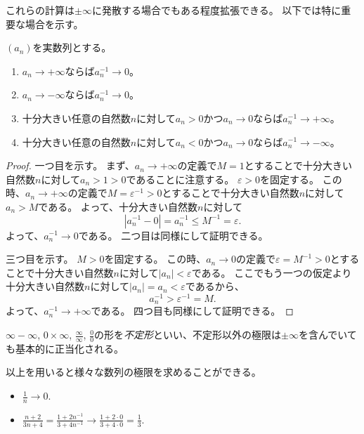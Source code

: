 これらの計算は$\pm \infty$に発散する場合でもある程度拡張できる。
以下では特に重要な場合を示す。

\begin{proposition}
$(a_n)$を実数列とする。
\begin{enumerate}
\item
$a_n \to +\infty$ならば$a_n^{-1} \to 0$。
\item
$a_n \to -\infty$ならば$a_n^{-1} \to 0$。
\item
十分大きい任意の自然数$n$に対して$a_n > 0$かつ$a_n \to 0$ならば$a_n^{-1} \to +\infty$。
\item
十分大きい任意の自然数$n$に対して$a_n < 0$かつ$a_n \to 0$ならば$a_n^{-1} \to -\infty$。
\end{enumerate}
\end{proposition}

\begin{proof}
一つ目を示す。
まず、$a_n \to +\infty$の定義で$M = 1$とすることで十分大きい自然数$n$に対して$a_n > 1 > 0$であることに注意する。
$\varepsilon > 0$を固定する。
この時、$a_n \to +\infty$の定義で$M = \varepsilon^{-1} > 0$とすることで十分大きい自然数$n$に対して$a_n > M$である。
よって、十分大きい自然数$n$に対して
$$
|a_n^{-1}-0| = a_n^{-1} \le M^{-1} = \varepsilon.
$$
よって、$a_n^{-1} \to 0$である。
二つ目は同様にして証明できる。

三つ目を示す。
$M > 0$を固定する。
この時、$a_n \to 0$の定義で$\varepsilon = M^{-1} > 0$とすることで十分大きい自然数$n$に対して$|a_n| < \varepsilon$である。
ここでもう一つの仮定より十分大きい自然数$n$に対して$|a_n| = a_n < \varepsilon$であるから、
$$
a_n^{-1} > \varepsilon^{-1} = M.
$$
よって、$a_n^{-1} \to +\infty$である。
四つ目も同様にして証明できる。
\end{proof}

$\infty-\infty$, $0\times\infty$, $\frac{\infty}{\infty}$, $\frac{0}{0}$の形を\emph{不定形}といい、不定形以外の極限は$\pm \infty$を含んでいても基本的に正当化される。

以上を用いると様々な数列の極限を求めることができる。

\begin{example}
\begin{itemize}
\item
$\frac{1}{n} \to 0$.
\item
$\frac{n+2}{3 n+4} = \frac{1+2 n^{-1}}{3+4 n^{-1}} \to \frac{1+2\cdot 0}{3+4\cdot 0} = \frac{1}{3}$.
\end{itemize}
\end{example}

